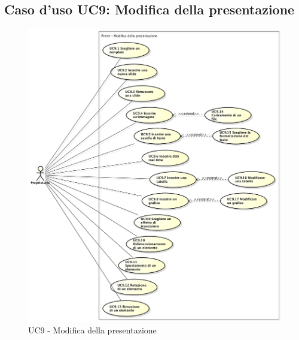 \subsection{Caso d'uso UC9: Modifica della presentazione}
\begin{figure}[h] 
	\centering 
	\includegraphics[scale=0.35] {img/UC9.png} 
	\caption{UC9 - Modifica della presentazione} 
\end{figure}

